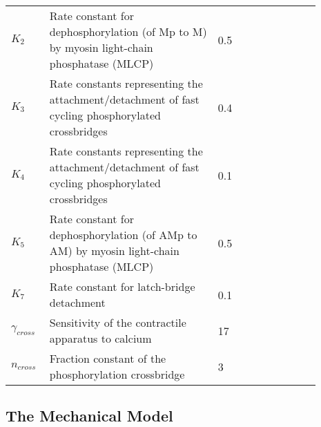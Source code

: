 \documentclass[fleqn]{report}
\numberwithin{equation}{section}
\numberwithin{equation}{section}
\begin{document}
	\begin{table}[h!]
	\centering
	\begin{tabular}{ p{0.09\linewidth}  >{\footnotesize} p{0.5\linewidth}  >{\footnotesize} p{0.27\linewidth} >{\footnotesize} p{0.03\linewidth} }
	\hline
	$K_{2}$      	& Rate constant for dephosphorylation (of Mp to M) by myosin light-chain phosphatase (MLCP)																			 & 0.5 \pers & \cite{Hai1989} \\
	$K_{3}$      	& Rate constants representing the attachment/detachment of fast cycling phosphorylated crossbridges																	 & 0.4 \pers	& \cite{Hai1989} \\
	$K_{4}$      	& Rate constants representing the attachment/detachment of fast cycling phosphorylated crossbridges 																	 & 0.1 \pers	& \cite{Hai1989} \\
	$K_{5}$      & Rate constant for dephosphorylation (of AMp to AM) by myosin light-chain phosphatase (MLCP)																			 & 0.5 \pers	& \cite{Hai1989} \\
	$K_{7}$      	& Rate constant for latch-bridge detachment					& 0.1 \pers	& \cite{Hai1989} \\
	$\gamma_{cross}$      	& Sensitivity of the contractile apparatus to calcium		& 17 \puMdries	& \cite{Koenigsberger2005} \\
	$n_{cross}$      		& Fraction constant of the phosphorylation crossbridge				& 3 \Dless	& \cite{Koenigsberger2005} \\
	\hline
	\end{tabular}
	\label{tab:crossbridge}
	\end{table}
	
	\subsection{The Mechanical Model}
	
\end{document}

